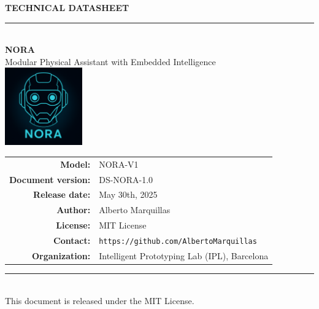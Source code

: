 \thispagestyle{empty}
\vspace*{1.5cm}

\begin{center}
	{\LARGE\bfseries TECHNICAL DATASHEET}\\[0.5cm]
	\rule{0.75\textwidth}{0.5pt}\\[1.5cm]
	
	{\Huge\bfseries NORA}\\[0.4cm]
	{\Large Modular Physical Assistant with Embedded Intelligence}\\[1.5cm]
	
	\includegraphics[width=0.25\textwidth]{images/nora-hero.png}\\[1.5cm]  %
	
	\begin{tabular}{rl}
		\textbf{Model:} & NORA-V1 \\
		\textbf{Document version:} & DS-NORA-1.0 \\
		\textbf{Release date:} & May 30th, 2025 \\
		\textbf{Author:} & Alberto Marquillas \\
		\textbf{License:} & MIT License \\
		\textbf{Contact:} & \texttt{https://github.com/AlbertoMarquillas} \\
		\textbf{Organization:} & Intelligent Prototyping Lab (IPL), Barcelona
	\end{tabular}
	
	\vfill
	\rule{0.75\textwidth}{0.5pt}\\
	{\small This document is released under the MIT License.}
\end{center}

\newpage
